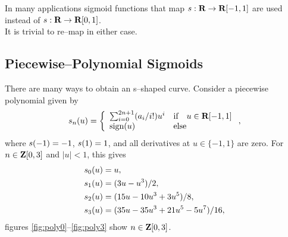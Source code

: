 \documentclass{article}
\begin{document}
    In many applications sigmoid functions that map $s:\textbf{R}\to\textbf{R}[-1,1]$ are used instead of $s:\textbf{R}\to\textbf{R}[0,1]$.\\
    It is trivial to re--map in either case.

    \clearpage

\subsection{Piecewise--Polynomial Sigmoids}


There are many ways to obtain an s--shaped curve.  Consider a piecewise polynomial given by
\begin{align}
    s_n(u)=\left\{
        \begin{array}{lllllllllllllllllll}
            \sum_{i=0}^{2n+1} (a_i/i!)u^i & \text{if}\quad u\in\textbf{R}[-1,1]
            \\
            \text{sign}(u) & \text{else}
        \end{array}\right., 
\end{align}
where $s (-1)=-1$, $s (1)=1$, and all derivatives at $u\in\{-1,1\}$ are zero.
For $n\in\textbf{Z}[0,3]$ and $|u|<1$, this gives
\begin{align*}
    s_0(u)&=u,\\
    s_1(u)&=(3 u - u^3)/2,\\
    s_2(u)&=(15 u - 10 u^3 + 3 u^5)/8,\\
    s_3(u)&=(35 u - 35 u^3 + 21 u^5 - 5 u^7)/16,
\end{align*}
figures \ref{fig:poly0}--\ref{fig:poly3} show $n\in\textbf{Z}[0,3]$.\\
\end{document}
